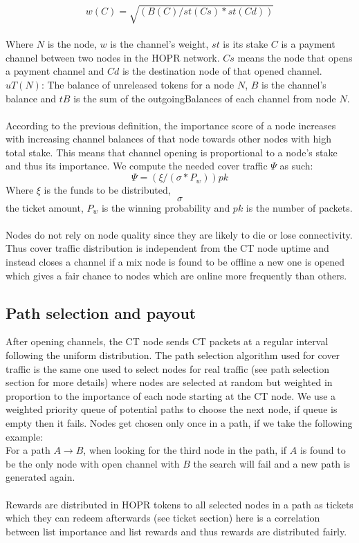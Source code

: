 $$w(C) = \sqrt{(B(C) / st(Cs) * st(Cd))}$$
\\
Where $N$ is the node, $w$ is the channel's weight, $st$ is its stake $C$ is a payment channel between two nodes in the HOPR network. $Cs$ means the node that opens a payment channel and 
$Cd$ is the destination node of that opened channel. $uT(N)$: The balance of unreleased tokens for a node $N$, $B$ is the channel's balance and $tB$ is the sum of the outgoingBalances of each channel from node $N$.
\\~\\ According to the previous definition, the importance score of a node increases with increasing channel balances of that node towards other nodes with high total stake. This means that channel opening is proportional to a node’s stake and thus its importance. We compute the needed cover traffic $\Psi$ as such:
$$\Psi= ( \xi/ (\sigma * P_w)) pk$$
Where $\xi$ is the funds to be distributed, $$\sigma$$ the ticket amount, $P_w$ is the winning probability and $pk$ is the number of packets.
\\~\\Nodes do not rely on node quality since they are likely to die or lose connectivity. Thus cover traffic distribution is independent from the CT node uptime and instead closes a channel if a mix node is found to be offline a new one is opened which gives a fair chance to nodes which are online more frequently than others. 

\subsection{Path selection and payout}
After opening channels, the CT node sends CT packets at a regular interval following the uniform distribution. The path selection algorithm used for cover traffic is the same one used to select nodes for real traffic (see path selection section for more details) where nodes are selected at random  but weighted in proportion to the importance of each node starting at the CT node. We use a weighted priority queue of potential paths to choose the next node, if queue is empty then it fails.
Nodes get chosen only once in a path, if we take the following example:
\\For a path $A\rightarrow B$, when looking for the third node in the path, if $A$ is found to be the only node with open channel with $B$ the search will fail and a new path is generated again.
\\~\\ Rewards are distributed in HOPR tokens to all selected nodes in a path as tickets which they can redeem afterwards (see ticket section) here is a correlation between list importance and list 
rewards and thus rewards are distributed fairly.

